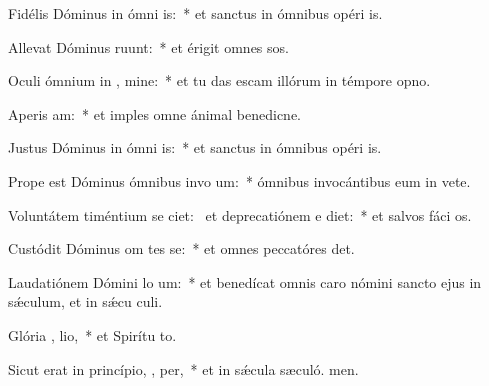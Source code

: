 \item Fidélis Dóminus in ómni  is:~* et sanctus in ómnibus opéri is.
\item Allevat Dóminus   ruunt:~* et érigit omnes sos.
\item Oculi ómnium in  , mine:~* et tu das escam illórum in témpore opno.
\item Aperis   am:~* et imples omne ánimal benedicne.
\item Justus Dóminus in ómni  is:~* et sanctus in ómnibus opéri is.
\item Prope est Dóminus ómnibus invo um:~* ómnibus invocántibus eum in vete.
\item Voluntátem timéntium se ciet:~\pscross{} et deprecatiónem e diet:~* et salvos fáci os.
\item Custódit Dóminus om tes se:~* et omnes peccatóres det.
\item Laudatiónem Dómini lo  um:~* et benedícat omnis caro nómini sancto ejus in sǽculum, et in sǽcu culi.
\item Glória ,  lio,~* et Spirítu to.
\item Sicut erat in princípio,  ,  per,~* et in sǽcula sæculó. men.
